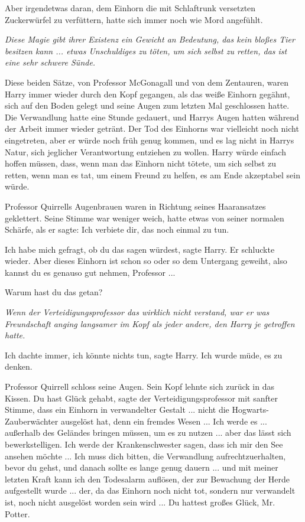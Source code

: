 Aber irgendetwas daran, dem Einhorn die mit Schlaftrunk versetzten Zuckerwürfel
zu verfüttern, hatte sich immer noch wie Mord angefühlt.

\emph{Diese Magie gibt ihrer Existenz ein Gewicht an Bedeutung, das kein bloßes
Tier besitzen kann ... etwas Unschuldiges zu töten, um sich selbst zu retten,
das ist eine sehr schwere Sünde.}

Diese beiden Sätze, von Professor McGonagall und von dem Zentauren, waren Harry
immer wieder durch den Kopf gegangen, als das weiße Einhorn gegähnt, sich auf
den Boden gelegt und seine Augen zum letzten Mal geschlossen hatte. Die
Verwandlung hatte eine Stunde gedauert, und Harrys Augen hatten während der
Arbeit immer wieder getränt. Der Tod des Einhorns war vielleicht noch nicht
eingetreten, aber er würde noch früh genug kommen, und es lag nicht in Harrys
Natur, sich jeglicher Verantwortung entziehen zu wollen. Harry würde einfach
hoffen müssen, dass, wenn man das Einhorn nicht tötete, um sich selbst zu
retten, wenn man es tat, um einem Freund zu helfen, es am Ende akzeptabel sein
würde.

Professor Quirrells Augenbrauen waren in Richtung seines Haaransatzes
geklettert. Seine Stimme war weniger weich, hatte etwas von seiner normalen
Schärfe, als er sagte: \glqq{}Ich verbiete dir, das noch einmal zu tun.\grqq{}

\glqq{}Ich habe mich gefragt, ob du das sagen würdest\grqq{}, sagte Harry. Er
schluckte wieder. \glqq{}Aber dieses Einhorn ist schon so oder so dem Untergang
geweiht, also kannst du es genauso gut nehmen, Professor ...\grqq{}

\glqq{}Warum hast du das getan?\grqq{}

\emph{Wenn der Verteidigungsprofessor das wirklich nicht verstand, war er was
Freundschaft anging langsamer im Kopf als jeder andere, den Harry je getroffen
hatte.}

\glqq{}Ich dachte immer, ich könnte nichts tun\grqq{}, sagte Harry. \glqq{}Ich
wurde müde, es zu denken.\grqq{}

Professor Quirrell schloss seine Augen. Sein Kopf lehnte sich zurück in das
Kissen. \glqq{}Du hast Glück gehabt\grqq{}, sagte der Verteidigungsprofessor mit
sanfter Stimme, \glqq{}dass ein Einhorn in verwandelter Gestalt ... nicht die
Hogwarts-Zauberwächter ausgelöst hat, denn ein fremdes Wesen ... Ich werde es ...
außerhalb des Geländes bringen müssen, um es zu nutzen ... aber das lässt sich
bewerkstelligen. Ich werde der Krankenschwester sagen, dass ich mir den See
ansehen möchte ... Ich muss dich bitten, die Verwandlung aufrechtzuerhalten,
bevor du gehst, und danach sollte es lange genug dauern ... und mit meiner
letzten Kraft kann ich den Todesalarm auflösen, der zur Bewachung der Herde
aufgestellt wurde ... der, da das Einhorn noch nicht tot, sondern nur verwandelt
ist, noch nicht ausgelöst worden sein wird ... Du hattest großes Glück, Mr.
Potter.\grqq{}

